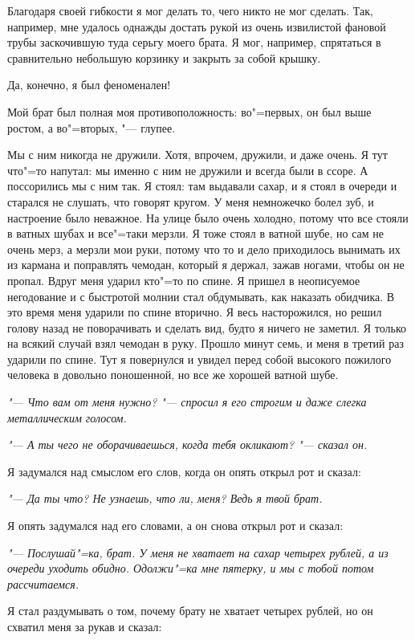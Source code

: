 Благодаря своей гибкости я мог делать то, чего никто не мог сделать. Так, например, мне удалось однажды достать рукой из очень извилистой фановой трубы заскочившую туда серьгу моего брата. Я мог, например, спрятаться в сравнительно небольшую корзинку и закрыть за собой крышку.

Да, конечно, я был феноменален!

Мой брат был полная моя противоположность: во"=первых, он был выше ростом, а во"=вторых, "--- глупее.

Мы с ним никогда не дружили. Хотя, впрочем, дружили, и даже очень. Я тут что"=то напутал: мы именно с ним не дружили и всегда были в ссоре. А поссорились мы с ним так. Я стоял: там выдавали сахар, и я стоял в очереди и старался не слушать, что говорят кругом. У меня немножечко болел зуб, и настроение было неважное. На улице было очень холодно, потому что все стояли в ватных шубах и все"=таки мерзли. Я тоже стоял в ватной шубе, но сам не очень мерз, а мерзли мои руки, потому что то и дело приходилось вынимать их из кармана и поправлять чемодан, который я держал, зажав ногами, чтобы он не пропал. Вдруг меня ударил кто"=то по спине. Я пришел в неописуемое негодование и с быстротой молнии стал обдумывать, как наказать обидчика. В это время меня ударили по спине вторично. Я весь насторожился, но решил голову назад не поворачивать и сделать вид, будто я ничего не заметил. Я только на всякий случай взял чемодан в руку. Прошло минут семь, и меня в третий раз ударили по спине. Тут я повернулся и увидел перед собой высокого пожилого человека в довольно поношенной, но все же хорошей ватной шубе.

\textit{"--- Что вам от меня нужно? "--- спросил я его строгим и даже слегка металлическим голосом.}

\textit{"--- А ты чего не оборачиваешься, когда тебя окликают? "--- сказал он.}

Я задумался над смыслом его слов, когда он опять открыл рот и сказал:

\textit{"--- Да ты что? Не узнаешь, что ли, меня? Ведь я твой брат.}

Я опять задумался над его словами, а он снова открыл рот и сказал:

\textit{"--- Послушай"=ка, брат. У меня не хватает на сахар четырех рублей, а из очереди уходить обидно. Одолжи"=ка мне пятерку, и мы с тобой потом рассчитаемся.}

Я стал раздумывать о том, почему брату не хватает четырех рублей, но он схватил меня за рукав и сказал:

